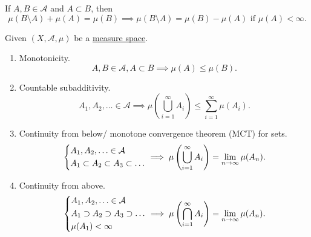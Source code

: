 \begin{note}
	If \(A, B\in \mathcal{A} \) and \(A\subset B\), then
	\[
		\mu(B\setminus A) + \mu(A) = \mu(B) \implies \mu(B \setminus A) = \mu(B) - \mu(A) \text{ if }\mu(A)<\infty.
	\]
\end{note}

\begin{theorem}\label{thm:measure-space}
	Given \((X, \mathcal{A} , \mu)\) be a \hyperref[def:measure-space]{measure space}.
	\begin{enumerate}
		\item \label{thm:measure-space-monotonicity}Monotonicity.
		      \[
			      A, B\in \mathcal{A} , A\subset B \implies \mu(A)\leq \mu(B).
		      \]
		\item Countable subadditivity.
		      \[
			      A_1, A_2, \ldots \in \mathcal{A} \implies \mu\left(\bigcup\limits_{i=1}^{\infty} A_{i}\right) \leq \sum\limits_{i=1}^{\infty} \mu(A_{i}).
		      \]
		\item \label{thm:measure-space-continuity-from-below} Continuity from below/ monotone convergence theorem (MCT) for sets.
		      \[
			      \begin{dcases}
				      A_1, A_2, \ldots \in \mathcal{A} \\
				      A_1\subset A_2\subset A_3\subset \ldots
			      \end{dcases} \implies \mu\left(\bigcup\limits_{i=1}^{\infty} A_{i}\right) = \lim\limits_{n \to \infty} \mu(A_{n}).
		      \]
		\item \label{thm:measure-space-continuity-from-above}Continuity from above.
		      \[
			      \begin{dcases}
				      A_1, A_2, \ldots \in \mathcal{A}        \\
				      A_1\supset A_2\supset A_3\supset \ldots \\
				      \mu(A_1) < \infty
			      \end{dcases} \implies \mu\left(\bigcap\limits_{i=1}^{\infty} A_{i}\right) = \lim\limits_{n \to \infty} \mu(A_{n}).
		      \]
	\end{enumerate}
\end{theorem}
